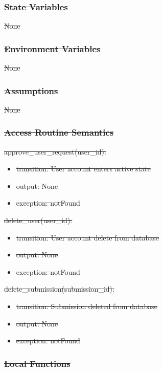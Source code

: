 \documentclass[12pt, titlepage]{article}
\begin{document}
\subsubsection{\sout{State Variables}}

\sout{None}

\subsubsection{\sout{Environment Variables}}

\sout{None}

\subsubsection{\sout{Assumptions}}

\sout{None}

\subsubsection{\sout{Access Routine Semantics}}

\noindent \sout{approve\_user\_request(user\_id):}
\begin{itemize}
\item \sout{transition: User account enters active state}
\item \sout{output: None}
\item \sout{exception: notFound}
\end{itemize}

\noindent \sout{delete\_user(user\_id):}
\begin{itemize}
\item \sout{transition: User account delete from database}
\item \sout{output: None}
\item \sout{exception: notFound}
\end{itemize}

\noindent \sout{delete\_submission(submission\_id):}
\begin{itemize}
\item \sout{transition: Submission deleted from database}
\item \sout{output: None}
\item \sout{exception: notFound}
\end{itemize}

\subsubsection{\sout{Local Functions}}
\end{document}

